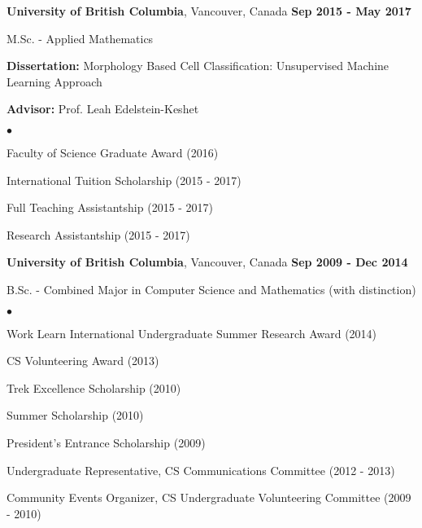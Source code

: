 \documentclass[margin,line]{res}
\newenvironment{list1}{
  \begin{list}{\ding{113}}{
      \setlength{\itemsep}{0in}
      \setlength{\parsep}{0in} \setlength{\parskip}{0in}
      \setlength{\topsep}{0in} \setlength{\partopsep}{0in}
      \setlength{\leftmargin}{0.17in}}}{\end{list}}
\newenvironment{list2}{
  \begin{list}{$\bullet$}{
      \setlength{\itemsep}{0in}
      \setlength{\parsep}{0in} \setlength{\parskip}{0in}
      \setlength{\topsep}{0in} \setlength{\partopsep}{0in}
      \setlength{\leftmargin}{0.2in}}}{\end{list}}
\newenvironment{list3}{
  \begin{list}{\textopenbullet}{
      \setlength{\itemsep}{0in}
      \setlength{\parsep}{0in} \setlength{\parskip}{0in}
      \setlength{\topsep}{0in} \setlength{\partopsep}{0in}
      \setlength{\leftmargin}{0.1in}}}{\end{list}}
\begin{document}
\begin{resume}
{\bf University of British Columbia}, Vancouver, Canada  \hfill {\bf Sep 2015 - May 2017}\\
\vspace*{-.2cm}
\begin{list1}
\item[] M.Sc. - Applied Mathematics
\vspace*{.1cm}
\item[] {\bf Dissertation:} Morphology Based Cell Classification: Unsupervised Machine Learning Approach
\vspace*{-0.3cm}
\item[] {\bf Advisor:} Prof. Leah Edelstein-Keshet
\begin{list2}
\vspace*{.1cm}
\setlength\itemsep{0.25em}
\item Faculty of Science Graduate Award (2016)
\item International Tuition Scholarship (2015 - 2017)
\item Full Teaching Assistantship (2015 - 2017)
\item Research Assistantship (2015 - 2017)
\end{list2}
\end{list1}
\vspace*{.2cm}

{\bf University of British Columbia}, Vancouver, Canada  \hfill {\bf Sep 2009 - Dec 2014}\\
\vspace*{-.2cm}
\begin{list1}
\item[] B.Sc. - Combined Major in Computer Science and Mathematics (with distinction)
\begin{list2}
\vspace*{.1cm}
\setlength\itemsep{0.25em}
\item Work Learn International Undergraduate Summer Research Award (2014)
\item CS Volunteering Award (2013)
\item Trek Excellence Scholarship (2010)
\item Summer Scholarship (2010)
\item President's Entrance Scholarship (2009)
\begin{list3}
\vspace*{.1cm}
\setlength\itemsep{0.25em}
\item Undergraduate Representative, CS Communications Committee (2012 - 2013)
\item Community Events Organizer, CS Undergraduate Volunteering Committee (2009 - 2010)
\end{list3}
\end{list2}
\end{list1}


\end{resume}
\end{document}
